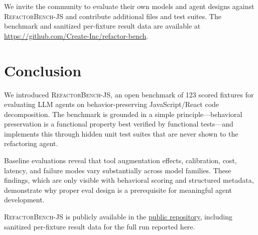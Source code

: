 \documentclass[11pt,letterpaper]{article}
\begin{document}
We invite the community to evaluate their own models and agent designs against \textsc{RefactorBench}-JS and contribute additional files and test suites. The benchmark and sanitized per-fixture result data are available at \url{https://github.com/Create-Inc/refactor-bench}.

\section{Conclusion}

We introduced \textsc{RefactorBench}-JS, an open benchmark of 123 scored fixtures for evaluating LLM agents on behavior-preserving JavaScript/React code decomposition. The benchmark is grounded in a simple principle---behavioral preservation is a functional property best verified by functional tests---and implements this through hidden unit test suites that are never shown to the refactoring agent.

Baseline evaluations reveal that tool augmentation effects, calibration, cost, latency, and failure modes vary substantially across model families. These findings, which are only visible with behavioral scoring and structured metadata, demonstrate why proper eval design is a prerequisite for meaningful agent development.

\textsc{RefactorBench}-JS is publicly available in the \href{https://github.com/Create-Inc/refactor-bench}{public repository}, including sanitized per-fixture result data for the full run reported here.



\end{document}
